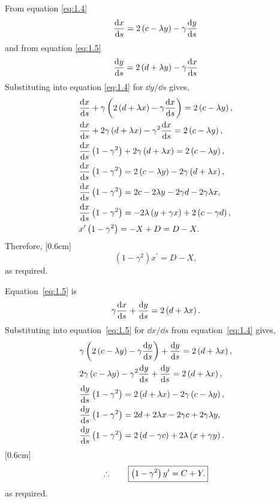 From equation \eqref{eq:1.4}
\[
	\frac{\mathrm{d}x}{\mathrm{d}s} = 2\left(c-\lambda y\right) - \gamma \frac{\mathrm{d}y}{\mathrm{d}s}
\]
and from equation \eqref{eq:1.5}
\[
	\frac{\mathrm{d}y}{\mathrm{d}s} = 2\left(d + \lambda y\right) - \gamma \frac{\mathrm{d}x}{\mathrm{d}s}
\]
Substituting into equation \eqref{eq:1.4} for $\dd y/ \dd s$ gives,
\begin{align*}
	{}&\frac{\mathrm{d}x}{\mathrm{d}s} + \gamma \left(2\left(d + \lambda x\right) - \gamma \frac{\mathrm{d}x}{\mathrm{d}s}\right) = 2\left(c-\lambda y\right),\\
	{}&\frac{\mathrm{d}x}{\mathrm{d}s} + 2 \gamma \left(d + \lambda x\right) - \gamma^2 \frac{\mathrm{d}x}{\mathrm{d}s} = 2\left(c-\lambda y\right),\\
	{}&\frac{\mathrm{d}x}{\mathrm{d}s}\left(1 - \gamma^2\right) + 2 \gamma \left(d + \lambda x\right)  = 2\left(c-\lambda y\right),\\
	{}&\frac{\mathrm{d}x}{\mathrm{d}s}\left(1 - \gamma^2\right) = 2\left(c-\lambda y\right) - 2 \gamma \left(d + \lambda x\right),\\
	{}&\frac{\mathrm{d}x}{\mathrm{d}s}\left(1 - \gamma^2\right) = 2c-2\lambda y - 2 \gamma d  - 2\gamma\lambda x,\\
	{}&\frac{\mathrm{d}x}{\mathrm{d}s}\left(1 - \gamma^2\right) = -2\lambda\left(y + \gamma x\right) + 2\left(c - \gamma d\right),\\
	{}&x^\prime\left(1 - \gamma^2\right) = -X+ D = D - X.
\end{align*}
Therefore, [0.6cm]
\begin{equation}
\label{eq:1.10}
	\boxed{(1-\gamma^2)x^\prime = D - X,}
\end{equation}
as required.

Equation~\eqref{eq:1.5} is
\[
	\gamma\frac{\mathrm{d}x}{\mathrm{d}s} + \frac{\mathrm{d}y}{\mathrm{d}s} = 2\left(d + \lambda x\right).
\]
Substituting into equation~\eqref{eq:1.5} for $\dd x/\dd s$ from equation~\eqref{eq:1.4} gives,
\begin{align*}
	{}& \gamma \left(2\left(c-\lambda y\right) - \gamma\frac{\mathrm{d}y}{\mathrm{d}s}\right) + \frac{\mathrm{d}y}{\mathrm{d}s} = 2\left(d + \lambda x\right),\\
	{}& 2\gamma\left(c-\lambda y\right) - \gamma^2\frac{\mathrm{d}y}{\mathrm{d}s} + \frac{\mathrm{d}y}{\mathrm{d}s} = 2\left(d + \lambda x\right),\\
	{}& \frac{\mathrm{d}y}{\mathrm{d}s}\left(1-\gamma^2\right) = 2\left(d + \lambda x\right) - 2\gamma\left(c-\lambda y\right),\\
	{}& \frac{\mathrm{d}y}{\mathrm{d}s}\left(1-\gamma^2\right) = 2d + 2\lambda x - 2\gamma c + 2\gamma\lambda y,\\
	{}& \frac{\mathrm{d}y}{\mathrm{d}s}\left(1-\gamma^2\right) = 2\left(d - \gamma c\right) + 2\lambda\left(x+\gamma y\right).\\
\end{align*}
[0.6cm]
\begin{equation}
\label{eq:1.11}
\therefore \qquad\boxed{\left(1-\gamma^2\right) y^\prime = C + Y.}
\end{equation}
as required.

